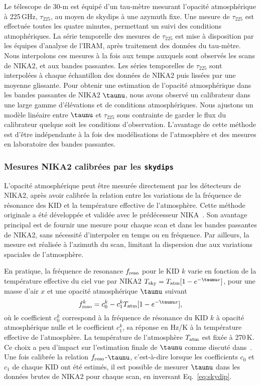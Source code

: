 Le télescope de 30-m est équipé d'un tau-mètre mesurant l'opacité
atmosphérique à 225\,GHz, $\tau_{225}$, au moyen de skydips à une
azymuth fixe. Une mesure de $\tau_{225}$ est effectuée toutes les
quatre minutes, permettant un suivi des conditions atmophériques. La
série temporelle des mesures de $\tau_{225}$ est mise à disposition
par les équipes d'analyse de l'IRAM, après traitement des données du
tau-mètre. Nous interpolons ces mesures à la fois aux temps auxquels
sont observés les scans de NIKA2, et aux bandes passantes. Les séries
temporelles de $\tau_{225}$ sont interpolées à chaque échantillon des
données de NIKA2 puis lissées par une moyenne glissante. Pour obtenir
une estimation de l'opacité atmosphérique dans les bandes passantes de
NIKA2 $\taunu$, nous avons observé un calibrateur dans une large
gamme d'élévations et de conditions atmosphériques. Nous ajustons un
modèle linéaire entre $\taunu$ et $\tau_{225}$ sous contrainte de
garder le flux du calibrateur quelque soit les conditions
d'observation. L'avantage de cette méthode est d'être indépendante à
la fois des modélisations de l'atmosphère et des mesures en
laboratoire des bandes passantes. 

\subsubsection{Mesures NIKA2 calibrées par les {\tt skydips}}

L'opacité atmosphérique peut être mesurée directement par les
détecteurs de NIKA2, après avoir calibrée la relation entre les
variations de la fréquence de résonance des KID et la température
effective de l'atmosphère. Cette méthode originale a été développée et
validée avec le prédécesseur NIKA~\citep{Catalano2014}. Son avantage
principal est de fournir une mesure pour chaque scan et dans les
bandes passantes de NIKA2, sans nécessité d'interpoler en temps ou en
fréquence. Par ailleurs, la mesure est réalisée à l'azimuth du scan,
limitant la dispersion due aux variations spaciales de l'atmosphère.

En pratique, la fréquence de resonance $f_{\rm{reso}}$ pour le KID $k$
varie en fonction de la température effective du ciel vue par
NIKA2 $T_{\rm{sky}} = T_{\rm{atm}}[1-e^{-\taunu x}]$, pour une masse
d'air $x$ et une opacité atmosphérique $\taunu$ suivant 
%
\begin{equation}
f_{\rm{reso}}^k  = c_0^k - c_1^k T_{\rm{atm}}[1-e^{-\taunu x}],
\label{eq:skydip}
\end{equation}
%
où le coefficient $c_0^k$ correspond à la fréquence de résonance du
KID $k$ à opacité atmosphérique nulle et le coefficient $c_1^k$, sa
réponse en Hz/K à la température effective de l'atmosphère. La
température de l'atmosphère $T_{\rm{atm}}$ est fixée à
270\,K. Ce choix a peu d'impact sur l'estimation finale de $\taunu$
comme discuté dans~\citet{Perotto2019}. Une fois calibrée la relation
$f_{\rm{reso}}$-$\taunu$, c'est-à-dire lorsque les coefficients $c_0$ et
$c_1$ de chaque KID ont été estimés, il est possible de mesurer
$\taunu$ dans les données brutes de NIKA2 pour chaque scan, en
inversant Eq.~\ref{eq:skydip}.

